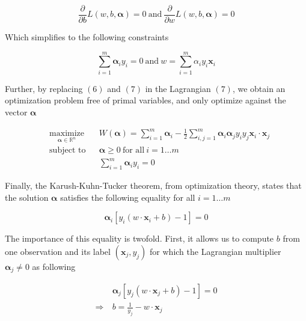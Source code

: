 \begin{equation}
  \frac{\partial}{\partial b}L(w, b, \boldsymbol{\alpha}) = 0
  \ \text{and}\ 
  \frac{\partial}{\partial w}L(w, b, \boldsymbol{\alpha}) = 0
\end{equation}

Which simplifies to the following constraints 

\begin{equation}
  \sum^m_{i=1} \boldsymbol{\alpha}_iy_i = 0
  \ \text{and}\ 
  w = \sum^m_{i=1} \alpha_iy_i\mathbf{x}_i
\end{equation}

Further, by replacing $(6)$ and $(7)$ in the Lagrangian $(7)$, we obtain an optimization problem free of primal variables, and only optimize against the vector $\boldsymbol{\alpha}$

\begin{equation}
  \begin{aligned}
    &\underset{\boldsymbol{\alpha} \in \mathbb{R}^n} {\text{maximize}}
    & & W(\boldsymbol{\alpha}) = \sum_{i=1}^m\boldsymbol{\alpha}_i - \frac{1}{2}\sum_{i,j=1}^m\boldsymbol{\alpha}_i\boldsymbol{\alpha}_jy_iy_j\mathbf{x}_i \cdot \mathbf{x}_j\\
    &\text{subject to}
    & &\boldsymbol{\alpha} \ge 0\ \text{for all}\ i = 1 \dotsc m\\
    & & &\sum^m_{i=1} \boldsymbol{\alpha}_iy_i = 0
  \end{aligned}
\end{equation}

Finally, the Karush-Kuhn-Tucker theorem, from optimization theory, states that the solution $\boldsymbol{\alpha}$ satisfies the following equality for all $i = 1\dotsc m$

\begin{equation}
  \boldsymbol{\alpha}_i[y_i(w \cdot \mathbf{x}_i + b) - 1] = 0
\end{equation}

The importance of this equality is twofold. First, it allows us to compute $b$ from one observation and its label $(\mathbf{x}_j, y_j)$ for which the Lagrangian multiplier $\boldsymbol{\alpha}_j \neq 0$ as following

\begin{equation}
  \begin{aligned}
    &\boldsymbol{\alpha}_j[y_j(w \cdot \mathbf{x}_j + b) - 1] = 0\\
    \Rightarrow\ &b = \frac{1}{y_j} - w \cdot \mathbf{x}_j
  \end{aligned}
\end{equation}

